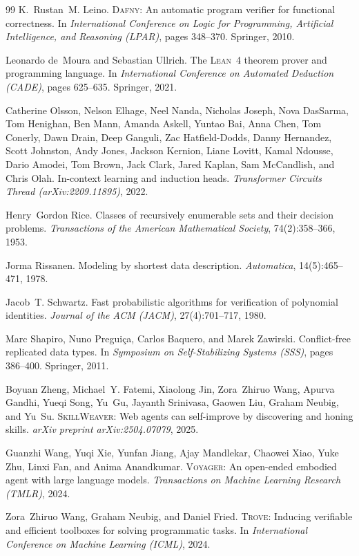 \documentclass[10pt,twocolumn]{article}
\begin{document}
\begin{thebibliography}{99}
K.~Rustan~M. Leino.
\newblock \textsc{Dafny}: An automatic program verifier for functional correctness.
\newblock In \emph{International Conference on Logic for Programming, Artificial Intelligence, and Reasoning (LPAR)}, pages 348--370. Springer, 2010.

Leonardo de~Moura and Sebastian Ullrich.
\newblock The \textsc{Lean~4} theorem prover and programming language.
\newblock In \emph{International Conference on Automated Deduction (CADE)}, pages 625--635. Springer, 2021.

Catherine Olsson, Nelson Elhage, Neel Nanda, Nicholas Joseph, Nova DasSarma, Tom Henighan, Ben Mann, Amanda Askell, Yuntao Bai, Anna Chen, Tom Conerly, Dawn Drain, Deep Ganguli, Zac Hatfield-Dodds, Danny Hernandez, Scott Johnston, Andy Jones, Jackson Kernion, Liane Lovitt, Kamal Ndousse, Dario Amodei, Tom Brown, Jack Clark, Jared Kaplan, Sam McCandlish, and Chris Olah.
\newblock In-context learning and induction heads.
\newblock \emph{Transformer Circuits Thread (arXiv:2209.11895)}, 2022.

Henry~Gordon Rice.
\newblock Classes of recursively enumerable sets and their decision problems.
\newblock \emph{Transactions of the American Mathematical Society}, 74(2):358--366, 1953.

Jorma Rissanen.
\newblock Modeling by shortest data description.
\newblock \emph{Automatica}, 14(5):465--471, 1978.

Jacob~T. Schwartz.
\newblock Fast probabilistic algorithms for verification of polynomial identities.
\newblock \emph{Journal of the ACM (JACM)}, 27(4):701--717, 1980.

Marc Shapiro, Nuno Pregui{\c{c}}a, Carlos Baquero, and Marek Zawirski.
\newblock Conflict-free replicated data types.
\newblock In \emph{Symposium on Self-Stabilizing Systems (SSS)}, pages 386--400. Springer, 2011.

Boyuan Zheng, Michael~Y. Fatemi, Xiaolong Jin, Zora~Zhiruo Wang, Apurva Gandhi, Yueqi Song, Yu~Gu, Jayanth Srinivasa, Gaowen Liu, Graham Neubig, and Yu~Su.
\newblock \textsc{SkillWeaver}: Web agents can self-im\allowbreak prove by discovering and honing skills.
\newblock \emph{arXiv preprint arXiv:2504.07079}, 2025.

Guanzhi Wang, Yuqi Xie, Yunfan Jiang, Ajay Mandlekar, Chaowei Xiao, Yuke Zhu, Linxi Fan, and Anima Anandkumar.
\newblock \textsc{Voyager}: An open-ended embodied agent with large language models.
\newblock \emph{Transactions on Machine Learning Research (TMLR)}, 2024.

Zora~Zhiruo Wang, Graham Neubig, and Daniel Fried.
\newblock \textsc{Trove}: Inducing verifiable and efficient toolboxes for solving programmatic tasks.
\newblock In \emph{International Conference on Machine Learning (ICML)}, 2024.

\end{thebibliography}
\end{document}
